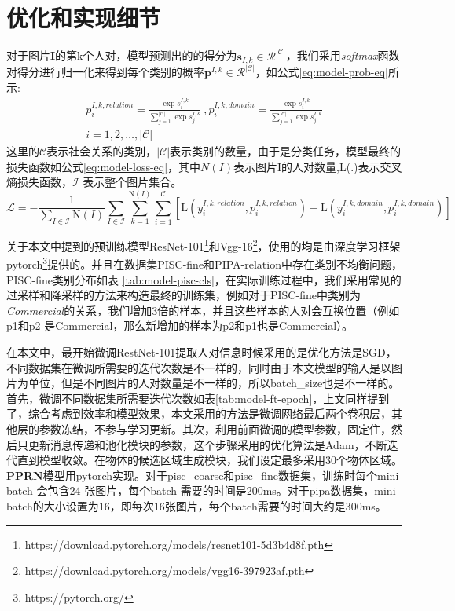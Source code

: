 \section{优化和实现细节}

对于图片\textbf{I}的第k个人对，模型预测出的的得分为$\mathbf{s}_{I,k} \in \mathcal{R}^{|\mathcal{C}|}$，我们采用{\it softmax}函数对得分进行归一化来得到每个类别的概率$\mathbf{p}^{I,k} \in \mathcal{R}^{|\mathcal{C}|}$，如公式\ref{eq:model-prob-eq}所示:
\begin{equation}
  \label{eq:model-prob-eq}
  \begin{split}
  p_i^{I,k,relation} = \frac{\exp{s_i^{I,k}}}{\sum_{j=1}^{|\mathcal{C}|}{\exp{s_j^{I,k}}}}~, p_i^{I,k,domain} = \frac{\exp{s_i^{I,k}}}{\sum_{j=1}^{|\mathcal{C}|}{\exp{s_j^{I,k}}}} \\
  i=1,2,\dots,|\mathcal{C}|
  \end{split}
\end{equation}
这里的$\mathcal{C}$表示社会关系的类别，$|\mathcal{C}|$表示类别的数量，由于是分类任务，模型最终的损失函数如公式\ref{eq:model-loss-eq}，其中$N(I)$表示图片I的人对数量,L(.)表示交叉熵损失函数，$\mathcal{I}$ 表示整个图片集合。
\begin{equation}
  \label{eq:model-loss-eq}
  \mathcal{L} = - \frac{1}{\sum_{I \in \mathcal{I}}\text{N}(I)} \sum_{I \in \mathcal{I}} \sum_{k=1}^{\text{N}(I)} \sum_{i=1}^{|\mathcal{C}|} [ \text{L}(y_{i}^{I,k,relation}, p_{i}^{I,k,relation}) + \text{L}(y_{i}^{I,k,domain}, p_{i}^{I,k,domain}) ]
\end{equation}

关于本文中提到的预训练模型ResNet-101\footnote{https://download.pytorch.org/models/resnet101-5d3b4d8f.pth}和Vgg-16\footnote{https://download.pytorch.org/models/vgg16-397923af.pth}，使用的均是由深度学习框架pytorch\footnote{https://pytorch.org/}提供的。并且在数据集PISC-fine和PIPA-relation中存在类别不均衡问题，PISC-fine类别分布如表
\ref{tab:model-pisc-cls}，在实际训练过程中，我们采用常见的过采样和降采样的方法来构造最终的训练集，例如对于PISC-fine中类别为{\it Commercial}的关系，我们增加3倍的样本，并且这些样本的人对会互换位置（例如p1和p2 是Commercial，那么新增加的样本为p2和p1也是Commercial）。

在本文中，最开始微调RestNet-101提取人对信息时候采用的是优化方法是SGD，不同数据集在微调所需要的迭代次数是不一样的，同时由于本文模型的输入是以图片为单位，但是不同图片的人对数量是不一样的，所以batch\_size也是不一样的。首先，微调不同数据集所需要迭代次数如表\ref{tab:model-ft-epoch}，上文同样提到了，综合考虑到效率和模型效果，本文采用的方法是微调网络最后两个卷积层，其他层的参数冻结，不参与学习更新。其次，利用前面微调的模型参数，固定住，然后只更新消息传递和池化模块的参数，这个步骤采用的优化算法是Adam\cite{kingma2014adam}，不断迭代直到模型收敛。在物体的候选区域生成模块，我们设定最多采用30个物体区域。\textbf{PPRN}模型用pytorch实现。对于pisc\_coarse和pisc\_fine数据集，训练时每个mini-batch 会包含24 张图片，每个batch 需要的时间是200ms。对于pipa数据集，mini-batch的大小设置为16，即每次16张图片，每个batch需要的时间大约是300ms。

